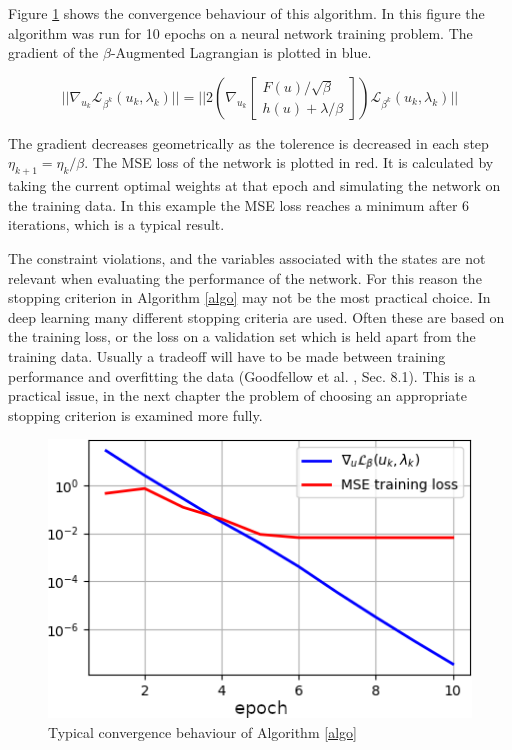 Figure \ref{nabla} shows the convergence behaviour of this algorithm. In this figure the algorithm was run for 10 epochs on a neural network training problem. The gradient of the $\beta$-Augmented Lagrangian is plotted in blue.

\begin{equation}
||\nabla_{u_k}\mathcal{L}_{\beta^k}(u_k,\lambda_k)|| = ||2(\nabla_{u_k}\begin{bmatrix} F(u)/\sqrt{\beta} \\ h(u) + \lambda/\beta \end{bmatrix})\mathcal{L}_{\beta^k}(u_k,\lambda_k)||
\end{equation}

The gradient decreases geometrically as the tolerence is decreased in each step $\eta_{k+1} = \eta_k/\beta$. The MSE loss of the network is plotted in red. It is calculated by taking the current optimal weights at that epoch and simulating the network on the training data. In this example the MSE loss reaches a minimum after 6 iterations, which is a typical result.

The constraint violations, and the variables associated with the states are not relevant when evaluating the performance of the network. For this reason the stopping criterion in Algorithm \ref{algo} may not be the most practical choice. In deep learning many different stopping criteria are used. Often these are based on the training loss, or the loss on a validation set which is held apart from the training data. Usually a tradeoff will have to be made between training performance and overfitting the data (Goodfellow et al. \cite{Goodfellow-et-al-2016}, Sec. 8.1). This is a practical issue, in the next chapter the problem of choosing an appropriate stopping criterion is examined more fully.

\begin{figure}
	\centering
	\includegraphics[width=.7\textwidth]{nabla}
	\caption{Typical convergence behaviour of Algorithm \ref{algo}}
	\label{nabla}
\end{figure}

